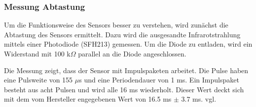 \subsubsection{Messung Abtastung}
Um die Funktionsweise des Sensors besser zu verstehen, wird zunächst die 
Abtastung des Sensors ermittelt. Dazu wird die ausgesandte Infrarotstrahlung 
mittels einer Photodiode (SFH213) gemessen. Um die Diode zu entladen, wird ein 
Widerstand mit 100 k$\Omega$ parallel an die Diode angeschlossen. 

\noindent Die Messung zeigt, dass der Sensor mit Impulspaketen arbeitet. Die Pulse haben 
eine Pulsweite von 155 $\mu$s und eine Periodendauer von 1 ms. Ein Impulspaket 
besteht aus acht Pulsen und wird alle 16 ms wiederholt. Dieser Wert deckt sich 
mit dem vom Hersteller engegebenen Wert von 16.5 ms $\pm$ 3.7 ms. vgl. 
\cite{Datasheet:GP2Y0A710K0F}

